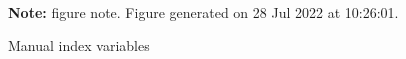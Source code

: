 \begin{figure}[!h]
\centering
\caption{Manual index variables}
\label{fig:key}
   \\ 
\par \begin{minipage}[h]{\textwidth}{\scriptsize\textbf{Note:} figure note. Figure generated on 28 Jul 2022 at 10:26:01.}\end{minipage}
\end{figure}
